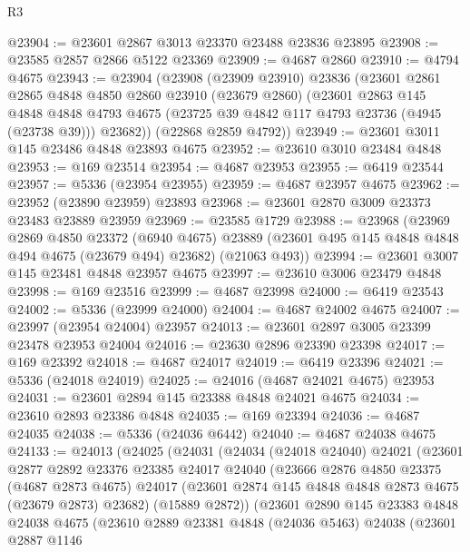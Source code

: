 \begin{lexlean}{R3}
\begin{coremodule}
@23904 := @23601 @2867 @3013 @23370 @23488 @23836 @23895
@23908 := @23585 @2857 @2866 @5122 @23369
@23909 := @4687 @2860
@23910 := @4794 @4675
@23943 := @23904
    (@23908
      (@23909 @23910)
      @23836
      (@23601
        @2861
        @2865
        @4848
        @4850
        @2860
        @23910
        (@23679 @2860)
        (@23601
          @2863
          @145
          @4848
          @4848
          @4793
          @4675
          (@23725 @39 @4842 @117 @4793 @23736 (@4945 (@23738 @39)))
          @23682))
      (@22868 @2859 @4792))
@23949 := @23601 @3011 @145 @23486 @4848 @23893 @4675
@23952 := @23610 @3010 @23484 @4848
@23953 := @169 @23514
@23954 := @4687 @23953
@23955 := @6419 @23544
@23957 := @5336 (@23954 @23955)
@23959 := @4687 @23957 @4675
@23962 := @23952 (@23890 @23959) @23893
@23968 := @23601 @2870 @3009 @23373 @23483 @23889 @23959
@23969 := @23585 @1729
@23988 := @23968
    (@23969
      @2869
      @4850
      @23372
      (@6940 @4675)
      @23889
      (@23601 @495 @145 @4848 @4848 @494 @4675 (@23679 @494) @23682)
      (@21063 @493))
@23994 := @23601 @3007 @145 @23481 @4848 @23957 @4675
@23997 := @23610 @3006 @23479 @4848
@23998 := @169 @23516
@23999 := @4687 @23998
@24000 := @6419 @23543
@24002 := @5336 (@23999 @24000)
@24004 := @4687 @24002 @4675
@24007 := @23997 (@23954 @24004) @23957
@24013 := @23601 @2897 @3005 @23399 @23478 @23953 @24004
@24016 := @23630 @2896 @23390 @23398
@24017 := @169 @23392
@24018 := @4687 @24017
@24019 := @6419 @23396
@24021 := @5336 (@24018 @24019)
@24025 := @24016 (@4687 @24021 @4675) @23953
@24031 := @23601 @2894 @145 @23388 @4848 @24021 @4675
@24034 := @23610 @2893 @23386 @4848
@24035 := @169 @23394
@24036 := @4687 @24035
@24038 := @5336 (@24036 @6442)
@24040 := @4687 @24038 @4675
@24133 := @24013
    (@24025
      (@24031
        (@24034
          (@24018 @24040)
          @24021
          (@23601
            @2877
            @2892
            @23376
            @23385
            @24017
            @24040
            (@23666
              @2876
              @4850
              @23375
              (@4687 @2873 @4675)
              @24017
              (@23601 @2874 @145 @4848 @4848 @2873 @4675 (@23679 @2873) @23682)
              (@15889 @2872))
            (@23601
              @2890
              @145
              @23383
              @4848
              @24038
              @4675
              (@23610
                @2889
                @23381
                @4848
                (@24036 @5463)
                @24038
                (@23601
                  @2887
                  @1146

\end{coremodule}
\end{lexlean}
